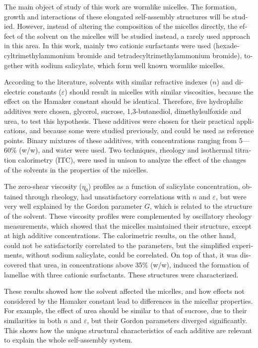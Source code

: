\documentclass[
	12pt,				%
	oneside,
	a4paper,			%
	english,			%
	brazil%
	]{abntex2}
\begin{document}
\begin{resumo}[Abstract]
 \begin{english}
 	The main object of study of this work are wormlike micelles. The formation, growth and interactions of these elongated self-assembly structures will be studied. However, instead of altering the composition of the micelles directly, the effect of the solvent on the micelles will be studied instead, a rarely used approach in this area. In this work, mainly two cationic surfactants were used (hexadecyltrimethylammonium bromide and tetradecyltrimethylammonium bromide), together with sodium salicylate, which form well known wormlike micelles.
 	
 	According to the literature, solvents with similar refractive indexes (\(n\)) and dielectric constants (\(\varepsilon\)) should result in micelles with similar viscosities, because the effect on the Hamaker constant should be identical. Therefore, five hydrophilic additives were chosen, glycerol, sucrose, 1,3-butanediol, dimethylsulfoxide and urea, to test this hypothesis. These additives were chosen for their practical applications, and because some were studied previously, and could be used as reference points. Binary mixtures of these additives, with concentrations ranging from 5---60\% (w/w), and water were used. Two techniques, rheology and isothermal titration calorimetry (ITC), were used in unison to analyze the effect of the changes of the solvents in the properties of the micelles.
 	
 	The zero-shear viscosity (\(\eta_0\)) profiles as a function of salicylate concentration, obtained through rheology, had unsatisfactory correlations with \(n\) and \(\varepsilon\), but were very well explained by the Gordon parameter \(G\), which is related to the structure of the solvent. These viscosity profiles were complemented by oscillatory rheology measurements, which showed that the micelles maintained their structure, except at high additive concentrations. The calorimetric results, on the other hand, could not be satisfactorily correlated to the parameters, but the simplified experiments, without sodium salicylate, could be correlated. On top of that, it was discovered that urea, in concentrations above 35\% (w/w), induced the formation of lamellae with three cationic surfactants. These structures were characterized.
 	
 	These results showed how the solvent affected the micelles, and how effects not considered by the Hamaker constant lead to differences in the micellar properties. For example, the effect of urea should be similar to that of sucrose, due to their similarities in both \(n\) and \(\varepsilon\), but their Gordon parameters diverged significantly. This shows how the unique structural characteristics of each additive are relevant to explain the whole self-assembly system.
 	

\end{english}
\end{resumo}
\end{document}
